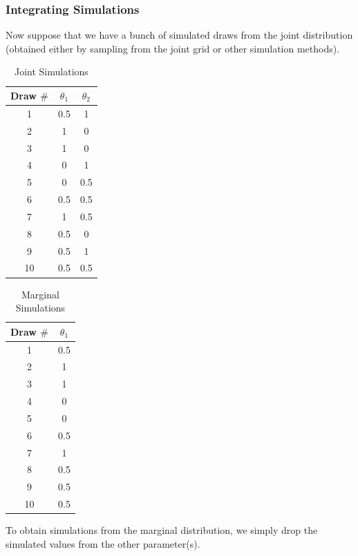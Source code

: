 \documentclass{beamer}
\begin{document}
\begin{frame}
\frametitle{Integrating Simulations}
\pause
Now suppose that we have a bunch of simulated draws from the joint
distribution (obtained either by sampling from the joint grid or other
simulation methods).

\begin{multicols}{2}
\scriptsize
\begin{table}[!htp]
\begin{center}
\caption{Joint Simulations}
\begin{tabular}{|c|c|c|}
\hline
Draw $\#$  & $\theta_1$ & $\theta_2$\\
\hline
1 & 0.5 & 1\\
2 & 1 & 0\\
3 & 1 & 0\\
4 & 0 & 1\\
5 & 0 & 0.5\\
6 & 0.5 & 0.5\\
7 & 1 & 0.5\\
8 & 0.5 & 0\\
9 & 0.5 & 1\\
10 & 0.5 & 0.5\\
\hline
\end{tabular}
\end{center}
\end{table}

\pause
\begin{table}[!htp]
\begin{center}
\caption{Marginal Simulations}
\begin{tabular}{|c|c|}
\hline
Draw $\#$  & $\theta_1$ \\
\hline
1 & 0.5 \\
2 & 1 \\
3 & 1 \\
4 & 0 \\
5 & 0 \\
6 & 0.5 \\
7 & 1 \\
8 & 0.5 \\
9 & 0.5 \\
10 & 0.5 \\
\hline
\end{tabular}
\end{center}
\end{table}
\end{multicols}
\pause
To obtain simulations from the marginal distribution, we simply drop
the simulated values from the other parameter(s).
\end{frame}
\end{document}
